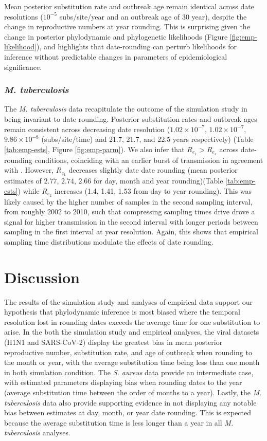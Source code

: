 \documentclass[11pt]{article}
\begin{document}
\begin{spacing}{1.5}
Mean posterior substitution rate and outbreak age remain identical across date resolutions ($10^{-5}$ subs/site/year and an outbreak age of 30 year), despite the change in reproductive numbers at year rounding. This is surprising given the change in posterior phylodynamic and phylogenetic likelihoods (Figure \ref{fig:emp-likelihood}), and highlights that date-rounding can perturb likelihoods for inference without predictable changes in parameters of epidemiological significance.

\subsubsection*{\textit{M. tuberculosis}}
The \textit{M. tuberculosis} data recapitulate the outcome of the simulation study in being invariant to date rounding. Posterior substitution rates and outbreak ages remain consistent across decreasing date resolution ($1.02\times10^{-7}$, $1.02\times10^{-7}$, $9.86\times10^{-8}$ (subs/site/time) and 21.7, 21.7, and 22.5 years respectively) (Table \ref{tab:emp-ests}, Figure \ref{fig:emp-parm}). We also infer that $R_{e_1} > R_{e_s}$ across date-rounding conditions, coinciding with an earlier burst of transmission in agreement with \citet{kuhnert_tuberculosis_2018}. However, $R_{e_1}$ decreases slightly date date rounding (mean posterior estimates of $2.77$, $2.74$, $2.66$ for day, month and year rounding)(Table \ref{tab:emp-ests}) while $R_{e_2}$ increases (1.4, 1.41, 1.53 from day to year rounding). This was likely caused by the higher number of samples in the second sampling interval, from roughly 2002 to 2010, such that compressing sampling times drive drove a signal for higher transmission in the second interval with longer periods between sampling in the first interval at year resolution. Again, this shows that empirical sampling time distributions modulate the effects of date rounding.

\section*{Discussion}
The results of the simulation study and analyses of empirical data support our hypothesis that phylodynamic inference is most biased where the temporal resolution lost in rounding dates exceeds the average time for one substitution to arise. In the both the simulation study and empirical analyses, the viral datasets (H1N1 and SARS-CoV-2) display the greatest bias in mean posterior reproductive number, substitution rate, and age of outbreak when rounding to the month or year, with the average substitution time being less than one month in both simulation condition. The \textit{S. aureus} data provide an intermediate case, with estimated parameters displaying bias when rounding dates to the year (average substitution time between the order of months to a year). Lastly, the \textit{M. tuberculosis} data also provide supporting evidence in not displaying any notable bias between estimates at day, month, or year date rounding. This is expected because the average substitution time is less longer than a year in all \textit{M. tuberculosis} analyses.


\end{spacing}
\end{document}
